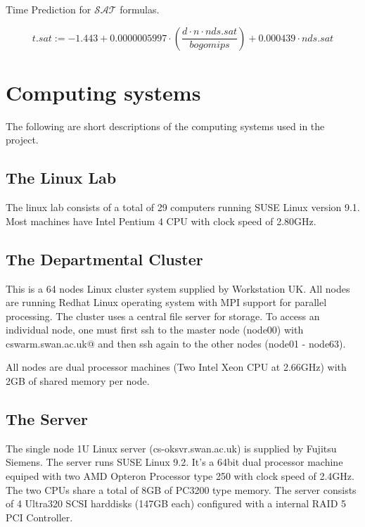 \documentclass{book}
\begin{document}
Time Prediction for $\mathcal{SAT}$ formulas.

\begin{displaymath}
t.sat := -1.443 + 0.0000005997 \cdot (\frac{d \cdot n \cdot nds.sat}{bogomips}) + 0.000439 \cdot nds.sat
\end{displaymath}




\chapter{Computing systems}
\label{cha:computing}

The following are short descriptions of the computing systems used in the project.
 
\section{The Linux Lab}
\label{sec:computinglinux}

The linux lab consists of a total of 29 computers running SUSE Linux version 9.1. Most machines have Intel Pentium 4 CPU with clock speed of 2.80GHz.  

\section{The Departmental Cluster}
\label{sec:computingcluster}

This is a 64 nodes Linux cluster system supplied by Workstation UK. All nodes are running Redhat Linux operating system with MPI support for parallel processing. The cluster uses a central file server for storage. To access an individual node, one must first ssh to the master node (node00) with \verb@ssh cswarm.swan.ac.uk@ and then ssh again to the other nodes (node01 - node63).

All nodes are dual processor machines (Two Intel Xeon CPU at 2.66GHz) with 2GB of shared memory per node.      
    
\section{The Server}
\label{sec:computingserver}

The single node 1U Linux server (cs-oksvr.swan.ac.uk) is supplied by Fujitsu Siemens. The server runs SUSE Linux 9.2. It's a 64bit dual processor machine equiped with two AMD Opteron Processor type 250 with clock speed of 2.4GHz. The two CPUs share a total of 8GB of PC3200 type memory. The server consists of 4 Ultra320 SCSI harddisks (147GB each) configured with a internal RAID 5 PCI Controller. 










\BibliographyOKlibrary
\end{document}
